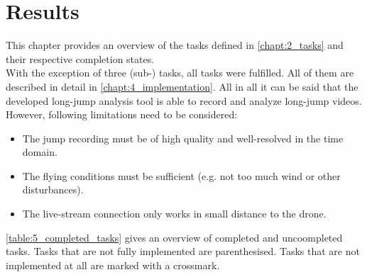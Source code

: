 \graphicspath{{./figures/}}
\chapter{Results}\label{chapt:5_res}
This chapter provides an overview of the tasks defined in \autoref{chapt:2_tasks}
and their respective completion states.\\
With the exception of three (sub-) tasks, all tasks were fulfilled.
All of them are described in detail in \autoref{chapt:4_implementation}.
All in all it can be said that the developed long-jump analysis tool is able
to record and analyze long-jump videos.
However, following limitations need to be considered:
\begin{itemize}
    \item The jump recording must be of high quality and well-resolved in the time domain.
    \item The flying conditions must be sufficient (e.g. not too much wind or other disturbances).
    \item The live-stream connection only works in small distance to the drone. 
\end{itemize}

\noindent \autoref{table:5_completed_tasks} gives an overview of completed and
uncoompleted tasks.
Tasks that are not fully implemented are parenthesised.
Tasks that are not implemented at all are marked with a crossmark. 

